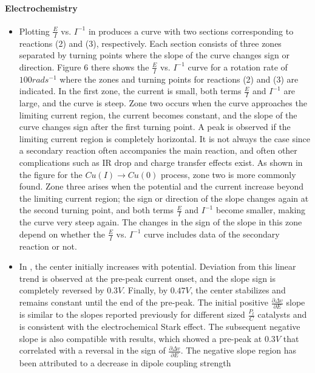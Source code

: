 \documentclass[11pt]{book}
\begin{document}
\paragraph{Electrochemistry}
\begin{itemize}
\item Plotting $\frac{E}{I}$ vs. $I^{-1}$ in \cite{ponce2007strategies}
produces a curve with two sections corresponding to reactions (2)
and (3), respectively. Each section consists of three zones separated
by turning points where the slope of the curve changes sign or direction.
Figure 6 there shows the $\frac{E}{I}$ vs. $I^{-1}$ curve for a
rotation rate of $100rads^{-1}$ where the zones and turning points
for reactions (2) and (3) are indicated. In the first zone, the current
is small, both terms $\frac{E}{I}$ and $I^{-1}$ are large, and the
curve is steep. Zone two occurs when the curve approaches the limiting
current region, the current becomes constant, and the slope of the
curve changes sign after the first turning point. A peak is observed
if the limiting current region is completely horizontal. It is not
always the case since a secondary reaction often accompanies the main
reaction, and often other complications such as IR drop and charge
transfer effects exist. As shown in the figure for the $Cu\left(I\right)\rightarrow Cu\left(0\right)$
process, zone two is more commonly found. Zone three arises when the
potential and the current increase beyond the limiting current region;
the sign or direction of the slope changes again at the second turning
point, and both terms $\frac{E}{I}$ and $I^{-1}$ become smaller,
making the curve very steep again. The changes in the sign of the
slope in this zone depend on whether the $\frac{E}{I}$ vs. $I^{-1}$
curve includes data of the secondary reaction or not.
\item In \cite{mcpherson2017electrochemical},
the center initially increases with potential. Deviation from this
linear trend is observed at the pre-peak current onset, and the slope
sign is completely reversed by $0.3V$. Finally, by $0.47V$, the
center stabilizes and remains constant until the end of the pre-peak.
The initial positive $\frac{\partial\Delta v}{\partial E}$ slope
is similar to the slopes reported previously for different sized $\frac{P_{t}}{C}$
catalysts and is consistent with the electrochemical Stark effect.
The subsequent negative slope is also compatible with results, which
showed a pre-peak at $0.3V$ that correlated with a reversal in the
sign of $\frac{\partial\Delta v}{\partial E}$. The negative slope
region has been attributed to a decrease in dipole coupling strength

\end{itemize}
\end{document}
